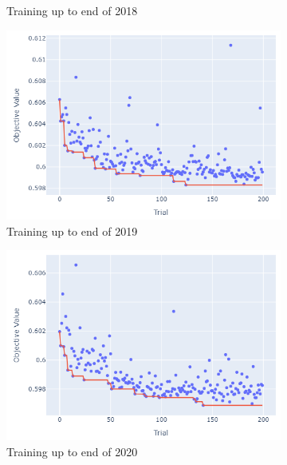 \documentclass[12pt,twoside]{report}
\begin{document}
\begin{figure}[htb]
\begin{subfigure}{.33\linewidth}
  \caption{Training up to end of 2018}
\end{subfigure}
\par\bigskip
\par\bigskip
\begin{subfigure}{.33\linewidth}
  \centering
  \includegraphics[width=0.95\linewidth]{figures/va_lightgbm_cutoff_2019.png}
  \caption{Training up to end of 2019}
\end{subfigure}%
\begin{subfigure}{.33\linewidth}
  \centering
  \includegraphics[width=0.95\linewidth]{figures/va_lightgbm_cutoff_2020.png}
  \caption{Training up to end of 2020}
\end{subfigure}%
\begin{subfigure}{.33\linewidth}
  \centering

\end{subfigure}
\end{figure}
\end{document}
